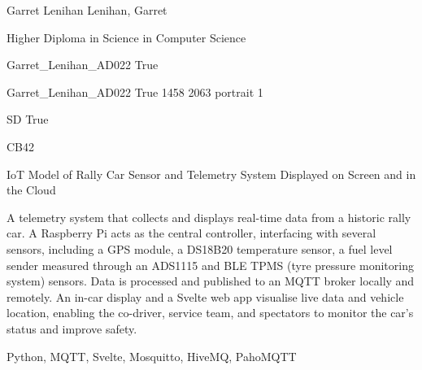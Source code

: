 \documentclass[twoside]{report}
\begin{document}
\begingroup{}\relax



\def\Key{Garret_Lenihan_AD022}

{Garret Lenihan}
{Lenihan, Garret}

{Higher Diploma in Science in Computer Science}

{Garret_Lenihan_AD022}
{True}

{Garret_Lenihan_AD022}
{True}
{1458}
{2063}
{portrait}
{1}

{SD}
{True}

{CB42}

{IoT Model of Rally Car Sensor and Telemetry System Displayed on Screen and in the Cloud}

{A telemetry system that collects and displays real-time data from a historic rally car. A Raspberry Pi acts as the central controller, interfacing with several sensors, including a GPS module, a DS18B20 temperature sensor, a fuel level sender measured through an ADS1115 and BLE TPMS (tyre pressure monitoring system) sensors. Data is processed and published to an MQTT broker locally and remotely. An in-car display and a Svelte web app visualise live data and vehicle location, enabling the co-driver, service team, and spectators to monitor the car's status and improve safety.}

{Python, MQTT, Svelte, Mosquitto, HiveMQ, PahoMQTT}
\end{document}

